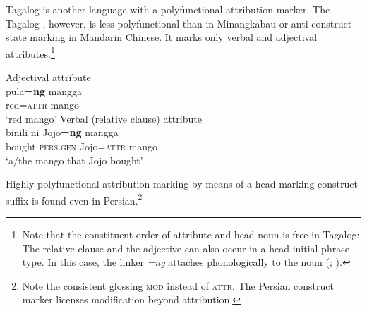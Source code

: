 Tagalog is another language with a polyfunctional attribution marker. The Tagalog , however, is less polyfunctional than  in Minangkabau or anti\hyp{}construct state marking in Mandarin Chinese. It marks only verbal and adjectival attributes.\footnote{Note that the constituent order of attribute and head noun is free in Tagalog: The relative clause and the adjective can also occur in a head-initial phrase type. In this case, the linker \textit{=ng} attaches phonologically to the noun (\citealt[1]{gil2005}; \citealt[160, 162]{himmelmann1997}).}
\begin{exe}
\ex 
{} \label{multi tagalog}
\begin{xlist}
\ex \rm{Adjectival attribute}\\
\gll	pula\textbf{=ng} mangga\\
	red{=\textsc{attr}} mango\\
\glt	‘red mango’
\ex \rm{Verbal (relative clause) attribute}\\
\gll	binili ni Jojo\textbf{=ng} mangga\\
	bought \textsc{pers.gen} Jojo{=\textsc{attr}} mango\\
\glt	‘a/the mango that Jojo bought’
\end{xlist}
\end{exe}
Highly polyfunctional attribution marking by means of a head-marking construct suffix is found even in Persian.\footnote{Note the consistent glossing \textsc{mod} instead of \textsc{attr}. The Persian construct marker licenses modification beyond attribution.}

